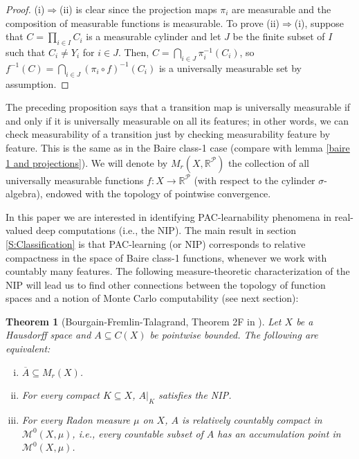 \documentclass[psamsfonts]{amsart}
\newtheorem{thm}{Theorem}[section]
\theoremstyle{definition}
\theoremstyle{remark}
\numberwithin{equation}{section}
\begin{document}
\begin{proof}
    (i)$\Rightarrow$(ii) is clear since the projection maps $\pi_i$ are measurable and the composition of measurable functions is measurable.
To prove (ii)$\Rightarrow$(i), suppose that $C=\prod_{i\in I}C_i$ is a measurable cylinder and let $J$ be the finite subset of $I$ such that $C_i\neq Y_i$ for $i\in J$.
Then, $C=\bigcap_{i\in J}\pi_i^{-1}(C_i)$, so $f^{-1}(C)=\bigcap_{i\in J}(\pi_i\circ f)^{-1}(C_i)$ is a universally measurable set by assumption.
\end{proof}

The preceding proposition says that a transition map is universally measurable if and only if it is universally measurable on all its features; in other words, we can check measurability of a transition just by checking measurability feature by feature.
This is the same as in the Baire class-1 case (compare with lemma \ref{baire 1 and projections}).
We will denote by $M_r(X,\mathbb{R}^\mathcal{P})$ the collection of all universally measurable functions $f:X\rightarrow\mathbb{R}^\mathcal{P}$ (with respect to the cylinder $\sigma$-algebra), endowed with the topology of pointwise convergence.

In this paper we are interested in identifying PAC-learnability phenomena in real-valued deep computations (i.e., the NIP).
The main result in section \ref{S:Classification} is that PAC-learning (or NIP) corresponds to relative compactness in the space of Baire class-1 functions, whenever we work with countably many features.
The following measure-theoretic characterization of the NIP will lead us to find other connections between the topology of function spaces and a notion of Monte Carlo computability (see next section):

\begin{thm}[Bourgain-Fremlin-Talagrand, Theorem 2F in \cite{BFT_1978_PCompactBaire}]\label{BFT-2F}
    Let $X$ be a Hausdorff space and $A\subseteq C(X)$ be pointwise bounded.
The following are equivalent:
    \begin{enumerate}[(i)]
        \item
        $\overline{A}\subseteq M_r(X)$.
        \item 
        For every compact $K\subseteq X$, $A|_K$ satisfies the NIP.
        \item
        For every Radon measure $\mu$ on $X$, $A$ is relatively countably compact in $\mathscr{M}^0(X,\mu)$, i.e., every countable subset of $A$ has an accumulation point in $\mathscr{M}^0(X,\mu)$.

    \end{enumerate}
\end{thm}
\end{document}
